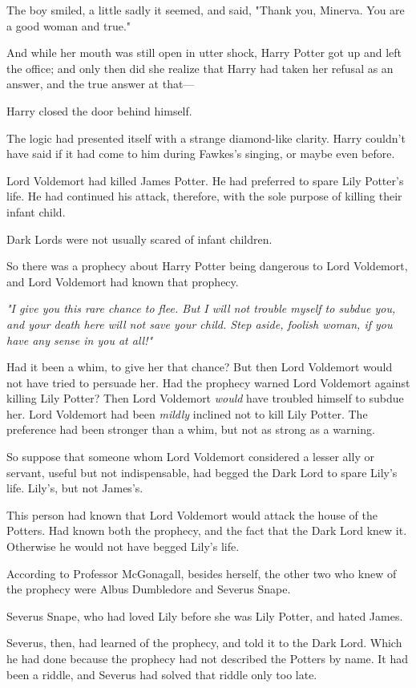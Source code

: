 The boy smiled, a little sadly it seemed, and said, "Thank you, Minerva. You
are a good woman and true."

And while her mouth was still open in utter shock, Harry Potter got up and left
the office; and only then did she realize that Harry had taken her refusal as
an answer, and the true answer at that---

Harry closed the door behind himself.

The logic had presented itself with a strange diamond-like clarity. Harry
couldn't have said if it had come to him during Fawkes's singing, or maybe even
before.

Lord Voldemort had killed James Potter. He had preferred to spare Lily Potter's
life. He had continued his attack, therefore, with the sole purpose of killing
their infant child.

Dark Lords were not usually scared of infant children.

So there was a prophecy about Harry Potter being dangerous to Lord Voldemort,
and Lord Voldemort had known that prophecy.

\emph{"I give you this rare chance to flee. But I will not trouble myself to
subdue you, and your death here will not save your child. Step aside, foolish
woman, if you have any sense in you at all!"}

Had it been a whim, to give her that chance? But then Lord Voldemort would not
have tried to persuade her. Had the prophecy warned Lord Voldemort against
killing Lily Potter? Then Lord Voldemort \emph{would} have troubled himself to
subdue her. Lord Voldemort had been \emph{mildly} inclined not to kill Lily
Potter. The preference had been stronger than a whim, but not as strong as a
warning.

So suppose that someone whom Lord Voldemort considered a lesser ally or
servant, useful but not indispensable, had begged the Dark Lord to spare Lily's
life. Lily's, but not James's.

This person had known that Lord Voldemort would attack the house of the
Potters. Had known both the prophecy, and the fact that the Dark Lord knew it.
Otherwise he would not have begged Lily's life.

According to Professor McGonagall, besides herself, the other two who knew of
the prophecy were Albus Dumbledore and Severus Snape.

Severus Snape, who had loved Lily before she was Lily Potter, and hated James.

Severus, then, had learned of the prophecy, and told it to the Dark Lord. Which
he had done because the prophecy had not described the Potters by name. It had
been a riddle, and Severus had solved that riddle only too late.

